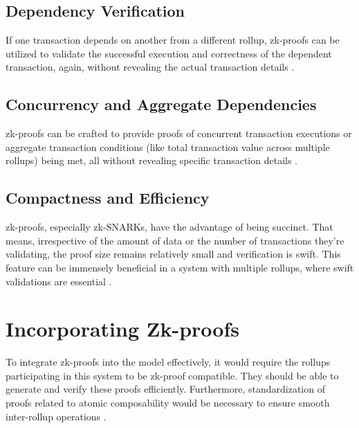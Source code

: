 \documentclass{article}
\begin{document}
\subsection{Dependency Verification}\label{dependency-verification}

If one transaction depends on another from a different rollup, zk-proofs
can be utilized to validate the successful execution and correctness of
the dependent transaction, again, without revealing the actual
transaction details \cite{micali1994cs}.

\subsection{Concurrency and Aggregate
Dependencies}\label{concurrency-and-aggregate-dependencies}

zk-proofs can be crafted to provide proofs of concurrent transaction
executions or aggregate transaction conditions (like total transaction
value across multiple rollups) being met, all without revealing specific
transaction details \cite{wahby2019fast}.

\subsection{Compactness and
Efficiency}\label{compactness-and-efficiency}

zk-proofs, especially zk-SNARKs, have the advantage of being succinct.
That means, irrespective of the amount of data or the number of
transactions they're validating, the proof size remains relatively small
and verification is swift. This feature can be immensely beneficial in a
system with multiple rollups, where swift validations are essential \cite{reitwiessner2016zk}.

\section{Incorporating Zk-proofs}\label{incorporating-zk-proofs}

To integrate zk-proofs into the model effectively, it would require the
rollups participating in this system to be zk-proof compatible. They
should be able to generate and verify these proofs efficiently.
Furthermore, standardization of proofs related to atomic composability
would be necessary to ensure smooth inter-rollup operations \cite{buterin2014next}.
\end{document}
